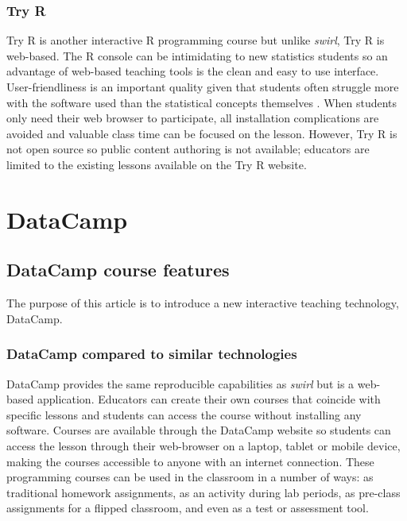 \documentclass[12pt]{article}\usepackage[]{graphicx}\usepackage[]{color}
\begin{document}
\subsubsection{Try R}
Try R \citep{TryR} is another interactive R programming course but unlike \textit{swirl}, Try R is web-based. 
The R console can be intimidating to
new statistics students so an advantage of web-based teaching tools is
the clean and easy to use interface. User-friendliness is an important quality given that students often struggle more with the
software used than the statistical concepts themselves \citep{Hare2017}. When students only need their web browser to participate,
all installation complications are avoided and valuable class time can be focused on the lesson.
However, Try R is not open source so public content authoring
is not available; educators are limited to the existing lessons available on the Try R website. 

\section{DataCamp}


\subsection{DataCamp course features}

The purpose of this article is to introduce a new interactive teaching technology, DataCamp.

\subsubsection{DataCamp compared to similar technologies}
DataCamp provides the same reproducible capabilities as \textit{swirl} but is a web-based application. Educators can
create their own courses that coincide with specific lessons and students can access the course without installing any software.
Courses are available through the DataCamp website so students can access the lesson through their web-browser on a laptop,
tablet or mobile device, making the courses accessible to anyone with an internet connection. These programming courses can be used in the 
classroom in a number of ways: as traditional homework assignments, as an activity during lab periods, as pre-class assignments
for a flipped classroom, and even as a test or assessment tool.
\end{document}
